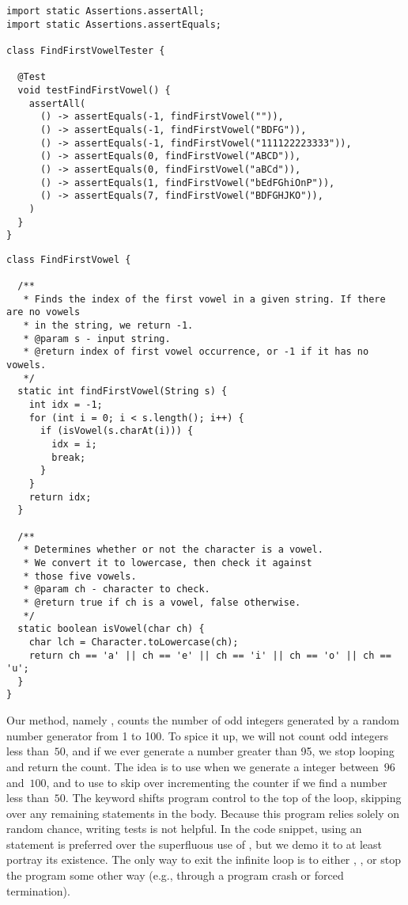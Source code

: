 \begin{lstlisting}[language=MyJava]
import static Assertions.assertAll;
import static Assertions.assertEquals;

class FindFirstVowelTester {

  @Test
  void testFindFirstVowel() {
    assertAll(
      () -> assertEquals(-1, findFirstVowel("")),
      () -> assertEquals(-1, findFirstVowel("BDFG")),
      () -> assertEquals(-1, findFirstVowel("111122223333")),
      () -> assertEquals(0, findFirstVowel("ABCD")),
      () -> assertEquals(0, findFirstVowel("aBCd")),
      () -> assertEquals(1, findFirstVowel("bEdFGhiOnP")),
      () -> assertEquals(7, findFirstVowel("BDFGHJKO")),
    )
  }
}
\end{lstlisting}

\begin{lstlisting}[language=MyJava]
class FindFirstVowel {

  /**
   * Finds the index of the first vowel in a given string. If there are no vowels
   * in the string, we return -1.
   * @param s - input string.
   * @return index of first vowel occurrence, or -1 if it has no vowels.
   */
  static int findFirstVowel(String s) {
    int idx = -1;
    for (int i = 0; i < s.length(); i++) {
      if (isVowel(s.charAt(i))) {
        idx = i;
        break;
      }
    }
    return idx;
  }

  /**
   * Determines whether or not the character is a vowel. 
   * We convert it to lowercase, then check it against 
   * those five vowels.
   * @param ch - character to check.
   * @return true if ch is a vowel, false otherwise.
   */
  static boolean isVowel(char ch) {
    char lch = Character.toLowercase(ch);
    return ch == 'a' || ch == 'e' || ch == 'i' || ch == 'o' || ch == 'u';
  }
}
\end{lstlisting}

Our method, namely , counts the number of odd integers generated by a random number generator from 1 to 100. 
To spice it up, we will not count odd integers less than~$50$, and if we ever generate a number greater than 95, we stop looping and return the count. 
The idea is to use  when we generate a integer between~$96$ and~$100$, and to use  to skip over incrementing the counter if we find a number less than~$50$. 
The  keyword shifts program control to the top of the loop, skipping over any remaining statements in the body. 
Because this program relies solely on random chance, writing tests is not helpful. 
In the code snippet, using an  statement is preferred over the superfluous use of , but we demo it to at least portray its existence. 
The only way to exit the infinite  loop is to either , , or stop the program some other way (e.g., through a program crash or forced termination).

